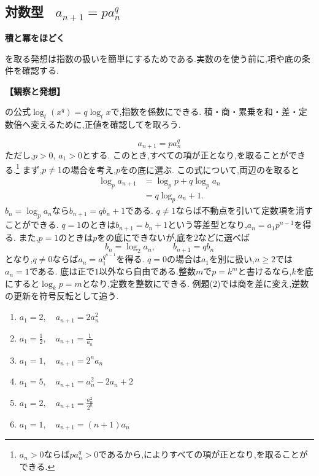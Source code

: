 
\subsection{\texorpdfstring{対数型 \, $a_{n+1}=pa_n^q$}{対数型}}\label{節：対数型}
  \begin{bookpoint}
    \textbf{積と冪をほどく}\par
    を取る発想は指数の扱いを簡単にするためである.実数のを使う前に,項や底の条件を確認する.
  \end{bookpoint}
  \noindent\textbf{【観察と発想】}\par
  の公式$\log_t(x^q)=q\log_t x$で,指数を係数にできる.
  積・商・累乗を和・差・定数倍へ変えるために,正値を確認してを取ろう.

  \[
    a_{n+1}=pa_n^q
  \]
  ただし,$p>0,\,a_1>0$とする. このとき,すべての項が正となり,を取ることができる.\footnote{$a_n>0$ならば$p a_n^q>0$であるから,によりすべての項が正となり,を取ることができる.}
  まず,$p\ne1$の場合を考え,$p$をの底に選ぶ.
  この式について,両辺のを取ると
  \[
    \begin{aligned}
      \log_pa_{n+1}&=\log_pp+q\log_pa_n\\
                  &=q\log_pa_n+1.
    \end{aligned}
  \]
  $b_n=\log_pa_n$なら$b_{n+1}=qb_n+1$である.
  $q\ne1$ならば不動点を引いて定数項を消すことができる.
  $q=1$のときは$b_{n+1}=b_n+1$という等差型となり,$a_n=a_1p^{n-1}$を得る.
  また,$p=1$のときは$p$をの底にできないが,底を$2$などに選べば
  \[
    b_n=\log_2a_n,\qquad b_{n+1}=qb_n
  \]
  となり,$q\ne0$ならば$a_n=a_1^{q^{n-1}}$を得る.
  $q=0$の場合は$a_1$を別に扱い,$n\ge2$では$a_n=1$である.
  底は正で$1$以外なら自由である.整数$m$で$p=k^m$と書けるなら,$k$を底にすると$\log_kp=m$となり,定数を整数にできる.
  例題(2)では商を差に変え,逆数の更新を符号反転として追う.

  \noindent{}\par\nobreak
  \begin{enumerate}[label=(\arabic*),parsep=3pt,format=\bookitemlink{example-logarithmic-1}{problem}{answer}]
    \item $\displaystyle a_1=2,\quad a_{n+1}=2a_n^2$
    \item $\displaystyle a_1=\frac{1}{2},\quad a_{n+1}=\frac{1}{a_n}$
    \item $\displaystyle a_1=1,\quad a_{n+1}=2^na_n$
    \item $\displaystyle a_1=5,\quad a_{n+1}=a_n^2-2a_n+2$
    \item $\displaystyle a_1=2,\quad a_{n+1}=\frac{a_n^2}{2^n}$
    \item $\displaystyle a_1=1,\quad a_{n+1}=(n+1)a_n$
  \end{enumerate}

